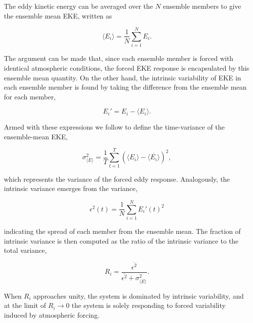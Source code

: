 \documentclass{agujournal2019}
\begin{document}
The eddy kinetic energy can be averaged over the $N$ ensemble members to give the ensemble mean EKE, written as
\begin{linenomath*}
\begin{equation}
\langle E_i \rangle = \frac{1}{N} \sum_{i=1}^N E_i.
\end{equation}
\end{linenomath*}
The argument can be made that, since each ensemble member is forced with identical atmospheric conditions, the forced EKE response is encapsulated by this ensemble mean quantity.
On the other hand, the intrinsic variability of EKE in each ensemble member is found by taking the difference from the ensemble mean for each member,
\begin{linenomath*}
\begin{equation}
E_i' = E_i - \langle E_i \rangle.
\end{equation}
\end{linenomath*}
Armed with these expressions we follow \citet{Leroux2018} to define the  time-variance of the ensemble-mean EKE,
\begin{linenomath*}
\begin{equation}
\sigma^2_{\langle E \rangle} = \frac{1}{T} \sum_{t=1}^T \left(\langle E_i \rangle -  \overline{\langle E_i \rangle}\right)^2,
\end{equation}
\end{linenomath*}
which represents the variance of the forced eddy response.
Analogously, the intrinsic variance emerges from the variance,
\begin{linenomath*}
\begin{equation}
\epsilon^2(t) = \frac{1}{N} \sum_{i=1}^N E_i'(t)^2
\end{equation}
\end{linenomath*}
indicating the spread of each member from the ensemble mean.
The fraction of intrinsic variance is then computed as the ratio of the intrinsic variance to the total variance,
\begin{linenomath*}
\begin{equation}
R_i =  \frac{\overline{\epsilon^2}}{\overline{\epsilon^2} + \sigma^2_{\langle E \rangle}}.
\end{equation}
\end{linenomath*}
When $R_i$ approaches unity, the system is dominated by intrinsic variability, and at the limit  of $R_i \to 0$ the system is solely responding to forced variability induced by atmospheric forcing.
\end{document}
